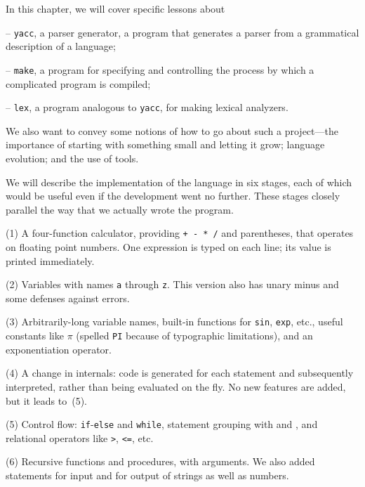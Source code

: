 In this chapter, we will cover specific lessons about
\item{--} {\tt yacc}, a parser generator, a program that generates
a parser from a grammatical description of a language;
\item{--} {\tt make}, a program for specifying and controlling the
process by which a complicated program is compiled;
\item{--} {\tt lex}, a program analogous to {\tt yacc}, for making
 lexical analyzers.
\par\noindent
We also want to convey some notions of how to go about such a
project---the importance of starting with something small and letting
it grow; language evolution; and the use of tools.

We will describe the implementation of the language in six stages,
each of which would be useful even if the development went no further.
These stages closely parallel the way that we actually wrote the
program.

\smallskip\item{(1)}
A four-function calculator, providing {\tt + - * /} and parentheses,
that operates on floating point numbers. One expression is typed on
each line; its value is printed immediately.

\smallskip\item{(2)}
Variables with names {\tt a} through {\tt z}. This version also has
unary minus and some defenses against errors.

\smallskip\item{(3)}
Arbitrarily-long variable names, built-in functions for {\tt sin},
{\tt exp}, etc., useful constants like $\pi$ (spelled {\tt PI}
because of typographic limitations), and an exponentiation operator.

\smallskip\item{(4)}
A change in internals: code is generated for each statement and
subsequently interpreted, rather than being evaluated on the fly.
No new features are added, but it leads to~(5).

\smallskip\item{(5)}
Control flow: {\tt if}-{\tt else} and {\tt while}, statement
grouping with {\tt\ocb} and {\tt\ccb}, and relational operators
like {\tt>}, {\tt<=}, etc.

\smallskip\item{(6)}
Recursive functions and procedures, with arguments. We also added
statements for input and for output of strings as well as numbers.

